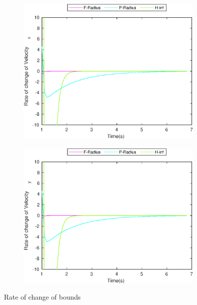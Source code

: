 \begin{figure}[!h]
\begin{subfigure}{.5\linewidth}
\end{subfigure}
\begin{subfigure}{.5\linewidth}
\centering
\includegraphics[width=.9\linewidth]{figures/BoundChange/CV/cv_bound_changeVelocity_x}
\end{subfigure}
\begin{subfigure}{.5\linewidth}
\centering
\includegraphics[width=.9\linewidth]{figures/BoundChange/CV/cv_bound_changeVelocity_y}
\end{subfigure}
\caption{Rate of change of bounds}
\end{figure}

